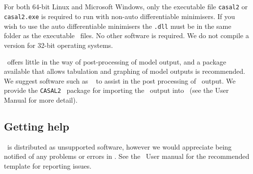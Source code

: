 \subsection{}

For both 64-bit Linux and Microsoft Windows, only the executable file \texttt{casal2} or \texttt{casal2.exe} is required to run \CNAME with non-auto differentiable minimisers. If you wish to use the auto differentiable minimisers the \texttt{.dll} must be in the same folder as the executable \CNAME\ files. No other software is required. We do not compile a version for 32-bit operating systems. 

\CNAME\ offers little in the way of post-processing of model output, and a package available that allows tabulation and graphing of model outputs is recommended. We suggest software such as \href{http://www.r-project.org}{\R}\ \citep{R} to assist in the post processing of \CNAME\ output. We provide the \texttt{CASAL2} \R\ package for importing the \CNAME\ output into \R\ (see the \CNAME User Manual for more detail).

\subsection{Getting help}

\CNAME\ is distributed as unsupported software, however we would appreciate being notified of any problems or errors in \CNAME. See the \CNAME\ User manual \citep{CASAL2} for the recommended template for reporting issues.


